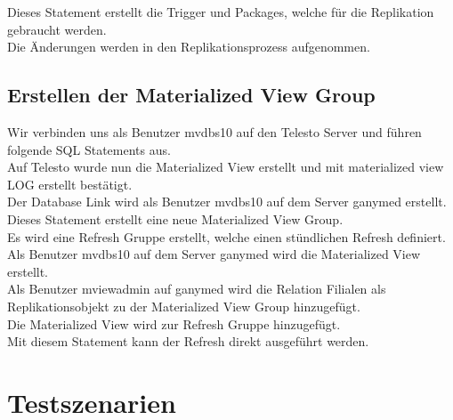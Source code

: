 \documentclass[11pt,a4paper,parskip=half]{scrartcl}
\begin{document}

Dieses Statement erstellt die Trigger und Packages, welche für die Replikation gebraucht werden.\\


Die Änderungen werden in den Replikationsprozess aufgenommen.\\

\subsection{Erstellen der Materialized View Group}
Wir verbinden uns als Benutzer mvdbs10 auf den Telesto Server und führen folgende SQL Statements aus.\\


Auf Telesto wurde nun die Materialized View erstellt und mit \glqq{}materialized view LOG erstellt\grqq{} bestätigt.\\


Der Database Link wird als Benutzer mvdbs10 auf dem Server ganymed erstellt.\\


Dieses Statement erstellt eine neue Materialized View Group.\\


Es wird eine Refresh Gruppe erstellt, welche einen stündlichen Refresh definiert.\\


Als Benutzer mvdbs10 auf dem Server ganymed wird die Materialized View erstellt.\\


Als Benutzer mviewadmin auf ganymed wird die Relation Filialen als Replikationsobjekt zu der Materialized View Group hinzugefügt.\\


Die Materialized View wird zur Refresh Gruppe hinzugefügt.\\


Mit diesem Statement kann der Refresh direkt ausgeführt werden.\\

\section{Testszenarien}
\end{document}
